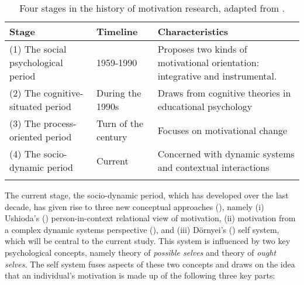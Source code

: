\documentclass[output=paper]{langsci/langscibook}
\begin{document}
\begin{table}
\begin{tabularx}{\textwidth}{QlQ}
\lsptoprule
\bfseries Stage & \bfseries Timeline & \bfseries Characteristics\\
\midrule 
(1)
         The social psychological period & 1959-1990 & Proposes two kinds of motivational orientation: integrative and instrumental.\\
\tablevspace         
(2)
         The cognitive-situated period & During the 1990s & Draws from cognitive theories in educational psychology \\
\tablevspace         
(3)
         The process-oriented period & Turn of the century & Focuses on motivational change\\
\tablevspace         
(4)
         The socio-dynamic period & Current & Concerned with dynamic systems and contextual interactions\\
\lspbottomrule
\end{tabularx}
\caption{Four stages in the history of motivation research, adapted from \citet{UshiodaDörnyei2012}.}
\label{tab:geoghegan:1}
\end{table}

The current stage, the socio-dynamic period, which has developed over the last decade, has given rise to three new conceptual approaches (\citealt{UshiodaDörnyei2012}), namely 
(i) Ushioda’s (\citeyear{Ushioda2009}) person-in-context relational view of  motivation, 
(ii) motivation from a complex dynamic systems perspective (\citealt{WaningeEtAl2014}), and 
(iii) Dörnyei’s (\citeyear{Dörnyei2009})   self system, which will be central to the current study. This system is influenced by two key psychological concepts, namely  theory of \textit{possible selves} and  theory of \textit{ought selves.} The   self system fuses aspects of these two concepts and draws on the idea that an individual’s motivation is made up of the following three key parts:
\end{document}
